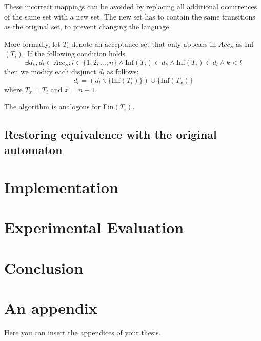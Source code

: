 \documentclass[
  digital, %
  twoside, %
  table,   %
  lof,     %
  lot,     %
]{fithesis3}
\begin{document}
These incorrect mappings can be avoided by replacing all additional occurrences of the same set with a new set. The new set has to contain the same transitions as the original set, to prevent changing the language. 

More formally, let $T_i$ denote an acceptance set that only appears in $Acc_S$ as Inf$(T_i)$. If the following condition holds
\begin{equation*}
  \exists d_k, d_l \in Acc_S \colon i \in \{1, 2, \dots, n\} \wedge \text{Inf}(T_i) \in d_k \wedge \text{Inf}(T_i) \in d_l \wedge k < l
\end{equation*}
then we modify each disjunct $d_l$ as follows:
\begin{equation*}
  d_l = (d_l \smallsetminus \{\text{Inf}(T_i)\}) \cup \{\text{Inf}(T_x)\}
\end{equation*}
where $T_x = T_i$ and $x = n + 1$.

The algorithm is analogous for Fin$(T_i)$.

\section{Restoring equivalence with the original automaton}
\label{sec:restore_equiv}

\chapter{Implementation}

\chapter{Experimental Evaluation}

\chapter{Conclusion}

\printbibliography[heading=bibintoc]

\makeatletter\thesis@blocks@clear\makeatother
{}
{} 
\printindex

\appendix
\chapter{An appendix}
Here you can insert the appendices of your thesis.
\end{document}
